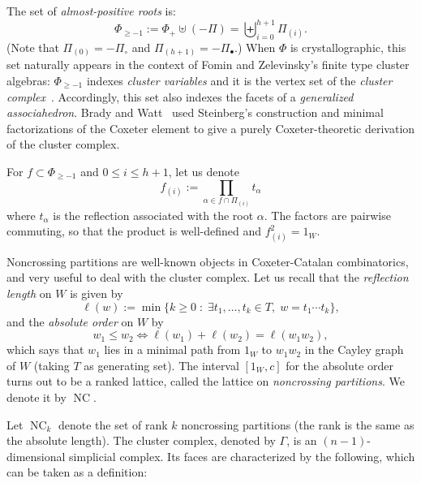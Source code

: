 \documentclass[11pt]{article}
\newtheorem{prop}[theo]{Proposition}
\theoremstyle{definition}
\DeclareMathOperator{\NC}{NC}
\begin{document}
The set of {\it almost-positive roots} is:
\[
    \Phi_{\geq -1} := \Phi_+ \uplus (-\Pi) = \biguplus_{i=0}^{h+1} \Pi_{(i)}.
\]
(Note that $\Pi_{(0)}=-\Pi_\circ$ and $\Pi_{(h+1)}=-\Pi_\bullet$.)  When $\Phi$ is crystallographic, this set naturally appears in the context of Fomin and Zelevinsky's finite type cluster algebras: $\Phi_{\geq -1}$ indexes {\it cluster variables} and it is the vertex set of the {\it cluster complex}~\cite{fominzelevinsky}.  Accordingly, this set also indexes the facets of a {\it generalized associahedron}.  Brady and Watt~\cite[Section~8]{bradywatt} used Steinberg's construction and minimal factorizations of the Coxeter element to give a purely Coxeter-theoretic derivation of the cluster complex. 

For $f \subset \Phi_{\geq -1}$ and $0\leq i \leq h+1$, let us denote
\[
    f_{(i)} := \prod_{\alpha \in f \cap \Pi_{(i)}} t_{\alpha}
\]
where $t_\alpha$ is the reflection associated with the root $\alpha$.  The factors are pairwise commuting, so that the product is well-defined and $f_{(i)}^2=1_W$.



Noncrossing partitions are well-known objects in Coxeter-Catalan combinatorics, and very useful to deal with the cluster complex.  Let us recall that the {\it reflection length} on $W$ is given by 
\[
    \ell(w) := 
    \min \big\{ 
        k\geq 0\;:\; \exists t_1,\dots,t_k \in T,\; w = t_1\cdots t_k
    \big\},
\]
and the {\it absolute order} on $W$ by
\[
    w_1 \leq w_2 
        \Longleftrightarrow
    \ell( w_1 ) + \ell( w_2 ) = \ell(w_1w_2),
\]
which says that $w_1$ lies in a minimal path from $1_W$ to $w_1w_2$ in the Cayley graph of $W$ (taking $T$ as generating set).  The interval $[1_W,c]$ for the absolute order turns out to be a ranked lattice, called the lattice on {\it noncrossing partitions}.  We denote it by $\NC$. 

Let $\NC_k$ denote the set of rank $k$ noncrossing partitions (the rank is the same as the absolute length).  The cluster complex, denoted by $\Gamma$, is an $(n-1)$-dimensional simplicial complex. Its faces are characterized by the following, which can be taken as a definition:
\end{document}
